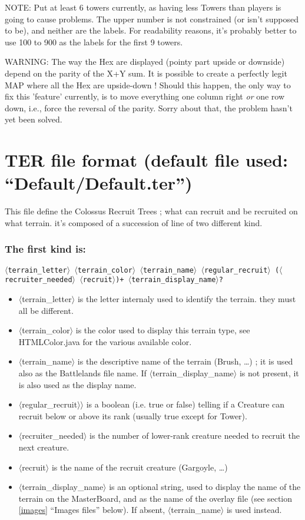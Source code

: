 \documentclass{article}
\begin{document}
NOTE: Put at least 6 towers currently, as having less Towers than
players is going to cause problems. The upper number is not
constrained (or isn't supposed to be), and neither are the labels.
For readability reasons, it's probably better to use 100 to 900
as the labels for the first 9 towers.

WARNING: The way the Hex are displayed (pointy part upside or
downside) depend on the parity of the X+Y sum. It is possible
to create a perfectly legit MAP where all the Hex are upside-down !
Should this happen, the only way to fix this 'feature' currently,
is to move everything one column right \emph{or} one row down, i.e.,
force the reversal of the parity. Sorry about that, the problem
hasn't yet been solved.

\section{TER file format (default file used: ``Default/Default.ter'')}

This file define the Colossus Recruit Trees ; what
can recruit and be recruited on what terrain. it's composed
of a succession of line of two different kind.

\subsubsection*{The first kind is:}

\texttt{$\langle$terrain\_letter$\rangle$ $\langle$terrain\_color$\rangle$ $\langle$terrain\_name$\rangle$ $\langle$regular\_recruit$\rangle$ ($\langle$recruiter\_needed$\rangle$ $\langle$recruit$\rangle$)+ $\langle$terrain\_display\_name$\rangle$?}

\begin{itemize}
\item $\langle$terrain\_letter$\rangle$ is the letter internaly used to identify the terrain. they must all be different.
\item $\langle$terrain\_color$\rangle$ is the color used to display this terrain type, see HTMLColor.java for the various available color.
\item $\langle$terrain\_name$\rangle$ is the descriptive name of the terrain (Brush, \ldots) ; it is used also as the Battlelands file name. If $\langle$terrain\_display\_name$\rangle$ is not present, it is also used as the display name.
\item $\langle$regular\_recruit$\rangle$$\rangle$ is a boolean (i.e. true or false) telling if a Creature can recruit below or above its rank (usually true except for Tower).
\item $\langle$recruiter\_needed$\rangle$ is the number of lower-rank creature needed to recruit the next creature.
\item $\langle$recruit$\rangle$ is the name of the recruit creature (Gargoyle, \ldots)
\item $\langle$terrain\_display\_name$\rangle$ is an optional string, used to display the name of the terrain on the MasterBoard, and as the name of the overlay file (see section \ref{images} ``Images files'' below). If absent, $\langle$terrain\_name$\rangle$ is used instead.
\end{itemize}
\end{document}
